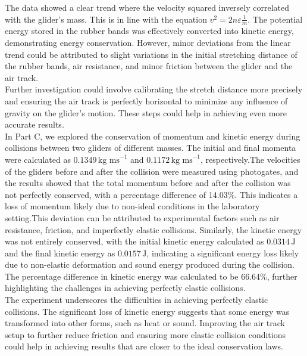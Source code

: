 \documentclass[a4paper,11pt]{article}
\begin{document}
The data showed a clear trend where the velocity squared inversely correlated with the glider's mass. This is in line with the equation \( v^2 = 2n\varepsilon\frac{1}{m} \). The potential energy stored in the rubber bands was effectively converted into kinetic energy, demonstrating energy conservation. However, minor deviations from the linear trend could be attributed to slight variations in the initial stretching distance of the rubber bands, air resistance, and minor friction between the glider and the air track.\\

Further investigation could involve calibrating the stretch distance more precisely and ensuring the air track is perfectly horizontal to minimize any influence of gravity on the glider's motion. These steps could help in achieving even more accurate results.\\

In Part C, we explored the conservation of momentum and kinetic energy during collisions between two gliders of different masses. The initial and final momenta were calculated as \(0.1349 \, \text{kg ms}^{-1}\) and \(0.1172 \, \text{kg ms}^{-1}\), respectively.The velocities of the gliders before and after the collision were measured using photogates, and the results showed that the total momentum before and after the collision was not perfectly conserved, with a percentage difference of 14.03\%. This indicates a loss of momentum likely due to non-ideal conditions in the laboratory setting.This deviation can be attributed to experimental factors such as air resistance, friction, and imperfectly elastic collisions. Similarly, the kinetic energy was not entirely conserved, with the initial kinetic energy calculated as \(0.0314 \, \text{J}\) and the final kinetic energy as \(0.0157 \, \text{J}\), indicating a significant energy loss likely due to non-elastic deformation and sound energy produced during the collision. The percentage difference in kinetic energy was calculated to be 66.64\%, further highlighting the challenges in achieving perfectly elastic collisions.\\

The experiment underscores the difficulties in achieving perfectly elastic collisions. The significant loss of kinetic energy suggests that some energy was transformed into other forms, such as heat or sound. Improving the air track setup to further reduce friction and ensuring more elastic collision conditions could help in achieving results that are closer to the ideal conservation laws.
\end{document}
